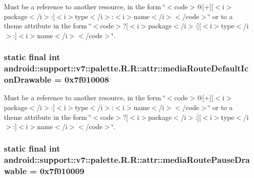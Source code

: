 Must be a reference to another resource, in the form \char`\"{}$<$code$>$@\mbox{[}+\mbox{]}\mbox{[}$<$i$>$package$<$/i$>$:\mbox{]}$<$i$>$type$<$/i$>$:$<$i$>$name$<$/i$>$$<$/code$>$\char`\"{} or to a theme attribute in the form \char`\"{}$<$code$>$?\mbox{[}$<$i$>$package$<$/i$>$:\mbox{]}\mbox{[}$<$i$>$type$<$/i$>$:\mbox{]}$<$i$>$name$<$/i$>$$<$/code$>$\char`\"{}. \hypertarget{classandroid_1_1support_1_1v7_1_1palette_1_1_r_1_1attr_71c04ac2d2e20dff416f4100c34f3e7e}{
\subsubsection[{mediaRouteDefaultIconDrawable}]{\setlength{\rightskip}{0pt plus 5cm}static final int android::support::v7::palette.R.R::attr::mediaRouteDefaultIconDrawable = 0x7f010008}}
\label{classandroid_1_1support_1_1v7_1_1palette_1_1_r_1_1attr_71c04ac2d2e20dff416f4100c34f3e7e}


Must be a reference to another resource, in the form \char`\"{}$<$code$>$@\mbox{[}+\mbox{]}\mbox{[}$<$i$>$package$<$/i$>$:\mbox{]}$<$i$>$type$<$/i$>$:$<$i$>$name$<$/i$>$$<$/code$>$\char`\"{} or to a theme attribute in the form \char`\"{}$<$code$>$?\mbox{[}$<$i$>$package$<$/i$>$:\mbox{]}\mbox{[}$<$i$>$type$<$/i$>$:\mbox{]}$<$i$>$name$<$/i$>$$<$/code$>$\char`\"{}. \hypertarget{classandroid_1_1support_1_1v7_1_1palette_1_1_r_1_1attr_19ff4187cdfe35899ecb361afdba4cef}{
\subsubsection[{mediaRoutePauseDrawable}]{\setlength{\rightskip}{0pt plus 5cm}static final int android::support::v7::palette.R.R::attr::mediaRoutePauseDrawable = 0x7f010009}}
\label{classandroid_1_1support_1_1v7_1_1palette_1_1_r_1_1attr_19ff4187cdfe35899ecb361afdba4cef}


